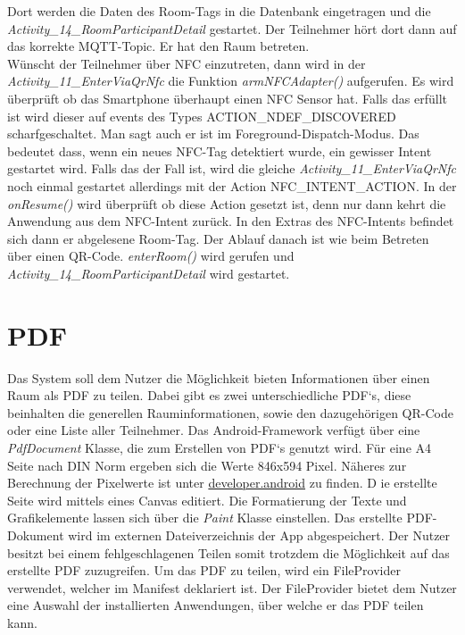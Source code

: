 Dort werden die Daten des Room-Tags in die Datenbank eingetragen und die \textit{Activity\_14\_RoomParticipantDetail} gestartet. Der Teilnehmer hört dort dann auf das korrekte MQTT-Topic. Er hat den Raum betreten.\\
Wünscht der Teilnehmer über NFC einzutreten, dann wird in der \textit{Activity\_11\_EnterViaQrNfc} die Funktion \textit{armNFCAdapter()} aufgerufen. Es wird überprüft ob das Smartphone überhaupt einen NFC Sensor hat.
Falls das erfüllt ist wird dieser auf events des Types ACTION\_NDEF\_DISCOVERED scharfgeschaltet. 
Man sagt auch er ist im Foreground-Dispatch-Modus.
Das bedeutet dass, wenn ein neues NFC-Tag detektiert wurde, ein gewisser Intent gestartet wird. 
Falls das der Fall ist, wird die gleiche \textit{Activity\_11\_EnterViaQrNfc} noch einmal gestartet allerdings mit der Action NFC\_INTENT\_ACTION. 
In der \textit{onResume()} wird überprüft ob diese Action gesetzt ist, denn nur dann kehrt die Anwendung aus dem NFC-Intent zurück.
In den Extras des NFC-Intents befindet sich dann er abgelesene Room-Tag. Der Ablauf danach ist wie beim Betreten über einen QR-Code. \textit{enterRoom()} wird gerufen und \textit{Activity\_14\_RoomParticipantDetail} wird gestartet.




\section{PDF}
\label{sec:PDF}
Das System soll dem Nutzer die Möglichkeit bieten Informationen über einen Raum als PDF zu teilen. 
Dabei gibt es zwei unterschiedliche PDF‘s, diese beinhalten die generellen Rauminformationen, sowie den dazugehörigen QR-Code oder eine Liste aller Teilnehmer.
Das Android-Framework  verfügt über eine \textit{PdfDocument} Klasse, die zum Erstellen von PDF‘s genutzt wird. 
Für eine A4 Seite nach DIN Norm ergeben sich die Werte 846x594 Pixel. Näheres zur Berechnung der Pixelwerte ist unter \href{https://developer.android.com/reference/android/graphics/pdf/PdfDocument.PageInfo}{developer.android} zu finden. D
ie erstellte Seite wird mittels eines Canvas editiert. 
Die Formatierung  der Texte und Grafikelemente lassen sich über die \textit{Paint} Klasse einstellen.
Das erstellte PDF-Dokument wird im externen Dateiverzeichnis der App abgespeichert. Der Nutzer besitzt bei einem fehlgeschlagenen Teilen somit trotzdem die Möglichkeit auf das erstellte PDF zuzugreifen.
Um das PDF zu teilen, wird ein FileProvider verwendet, welcher im Manifest deklariert ist.  Der FileProvider bietet dem Nutzer eine Auswahl der installierten Anwendungen, über welche er das PDF teilen kann.



